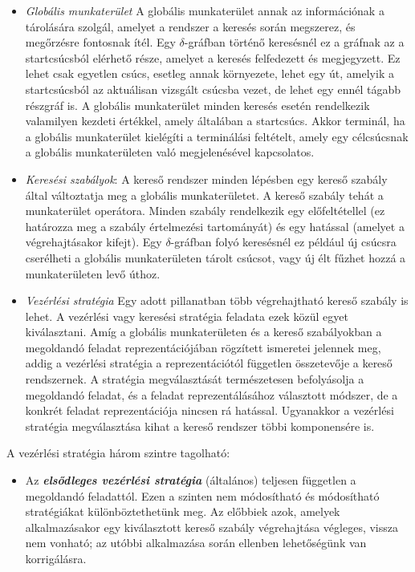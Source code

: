 \documentclass[12pt,margin=0px]{article}
\begin{document}
    {\footnotesize
    \noindent {\color{blue} \faLightbulbO\ $\triangleright$ }
    \begin{itemize}
        \item \textit{{Globális munkaterület}} A globális munkaterület annak az információnak a tárolására szolgál, amelyet a rendszer a keresés során megszerez, és megőrzésre fontosnak ítél. Egy $\delta$-gráfban történő keresésnél ez a gráfnak az a startcsúcsból elérhető része, amelyet a keresés felfedezett és megjegyzett. Ez lehet csak egyetlen csúcs, esetleg annak környezete, lehet egy út, amelyik a startcsúcsból az aktuálisan vizsgált csúcsba vezet, de lehet egy ennél tágabb részgráf is. A globális munkaterület minden keresés esetén rendelkezik valamilyen kezdeti értékkel, amely általában a startcsúcs. Akkor terminál, ha a globális munkaterület kielégíti a terminálási feltételt, amely egy célcsúcsnak a globális munkaterületen való megjelenésével kapcsolatos.
        \item \textit{{Keresési szabályok}}: A kereső rendszer minden lépésben egy kereső szabály által változtatja meg a globális munkaterületet. A kereső szabály tehát a munkaterület operátora. Minden szabály rendelkezik egy előfeltétellel (ez határozza meg a szabály értelmezési tartományát) és egy hatással (amelyet a végrehajtásakor kifejt). Egy $\delta$-gráfban folyó keresésnél ez például új csúcsra cserélheti a globális munkaterületen tárolt csúcsot, vagy új élt fűzhet hozzá a munkaterületen levő úthoz.
        \item \textit{{Vezérlési stratégia}} Egy adott pillanatban több végrehajtható kereső szabály is lehet. A vezérlési vagy keresési stratégia feladata ezek közül egyet kiválasztani. Amíg a globális munkaterületen és a kereső szabályokban a megoldandó feladat reprezentációjában rögzített ismeretei jelennek meg, addig a vezérlési stratégia a reprezentációtól független összetevője a kereső rendszernek. A stratégia megválasztását természetesen befolyásolja a megoldandó feladat, és a feladat reprezentálásához választott módszer, de a konkrét feladat reprezentációja nincsen rá hatással. Ugyanakkor a vezérlési stratégia megválasztása kihat a kereső rendszer többi komponensére is.\\
    \end{itemize}
    A vezérlési stratégia három szintre tagolható:
    \begin{itemize}
                \item Az \textbf{\emph{elsődleges vezérlési stratégia}} (általános) teljesen független a megoldandó feladattól. Ezen a szinten nem módosítható és módosítható stratégiákat különböztethetünk meg. Az előbbiek azok, amelyek alkalmazásakor egy kiválasztott kereső szabály végrehajtása végleges, vissza nem vonható; az utóbbi alkalmazása során ellenben lehetőségünk van korrigálásra.

\end{itemize}}
\end{document}
